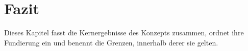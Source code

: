 \section{Fazit}\label{sec:fazit}

Dieses Kapitel fasst die Kernergebnisse des Konzepts zusammen, ordnet ihre Fundierung ein und benennt die Grenzen, innerhalb derer sie gelten.



